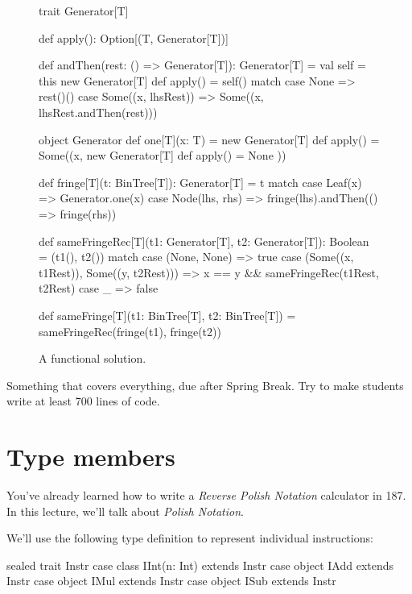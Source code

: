 \documentclass{book}
\begin{document}
\begin{figure}
\begin{scalacode}
trait Generator[T] {
  def apply(): Option[(T, Generator[T])]

  def andThen(rest: () => Generator[T]): Generator[T] = {
    val self = this
    new Generator[T] {
      def apply() = self() match {
        case None => rest()()
        case Some((x, lhsRest)) => Some((x, lhsRest.andThen(rest)))
      }
    }
  }
}

object Generator {
  def one[T](x: T) = new Generator[T] {
    def apply() = Some((x, new Generator[T] { def apply() = None }))
  }
}

def fringe[T](t: BinTree[T]): Generator[T] = t match {
  case Leaf(x) => Generator.one(x)
  case Node(lhs, rhs) => fringe(lhs).andThen(() => fringe(rhs))
}

def sameFringeRec[T](t1: Generator[T], t2: Generator[T]): Boolean = (t1(), t2()) match {
  case (None, None) => true
  case (Some((x, t1Rest)), Some((y, t2Rest))) => x == y && sameFringeRec(t1Rest, t2Rest)
  case _ => false
}

def sameFringe[T](t1: BinTree[T], t2: BinTree[T]) = sameFringeRec(fringe(t1), fringe(t2))
\end{scalacode}
\caption{A functional solution.}
\label{sameFringeFun}
\end{figure}



\newlecture


Something that covers everything, due after Spring Break. Try to make students
write at least 700 lines of code.

\newlecture

\newlecture

\section{Type members}

You've already learned how to write a \emph{Reverse Polish Notation} calculator
in 187. In this lecture, we'll talk about \emph{Polish Notation}.

We'll use the following type definition to represent individual instructions:
%
\begin{scalacode}
sealed trait Instr
case class IInt(n: Int) extends Instr
case object IAdd extends Instr
case object IMul extends Instr
case object ISub extends Instr
\end{scalacode}
\end{document}
